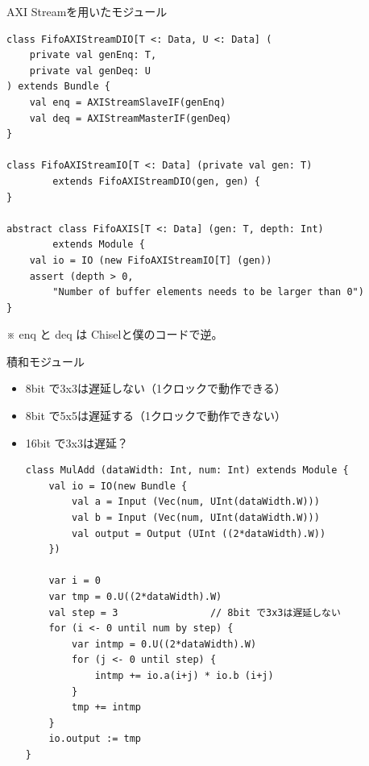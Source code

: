 \begin{frame}[fragile]{AXI Streamを用いたモジュール}
    \begin{lstlisting}
class FifoAXIStreamDIO[T <: Data, U <: Data] (
    private val genEnq: T,
    private val genDeq: U
) extends Bundle {
    val enq = AXIStreamSlaveIF(genEnq)
    val deq = AXIStreamMasterIF(genDeq)
}

class FifoAXIStreamIO[T <: Data] (private val gen: T)
        extends FifoAXIStreamDIO(gen, gen) {
}

abstract class FifoAXIS[T <: Data] (gen: T, depth: Int)
        extends Module {
    val io = IO (new FifoAXIStreamIO[T] (gen))
    assert (depth > 0, 
        "Number of buffer elements needs to be larger than 0")
}
    \end{lstlisting}
    
    ※ enq と deq は Chiselと僕のコードで逆。
\end{frame}

\begin{frame}[fragile]{積和モジュール}

\begin{itemize}
    \item 8bit で3x3は遅延しない（1クロックで動作できる）
    \item 8bit で5x5は遅延する（1クロックで動作できない）
    \item 16bit で3x3は遅延？
\begin{lstlisting}
class MulAdd (dataWidth: Int, num: Int) extends Module {
    val io = IO(new Bundle {
        val a = Input (Vec(num, UInt(dataWidth.W)))
        val b = Input (Vec(num, UInt(dataWidth.W)))
        val output = Output (UInt ((2*dataWidth).W))
    })

    var i = 0
    var tmp = 0.U((2*dataWidth).W)
    val step = 3                // 8bit で3x3は遅延しない
    for (i <- 0 until num by step) {
        var intmp = 0.U((2*dataWidth).W)
        for (j <- 0 until step) {
            intmp += io.a(i+j) * io.b (i+j)
        }
        tmp += intmp
    }
    io.output := tmp    
}
\end{lstlisting}
\end{itemize}
    
\end{frame}




